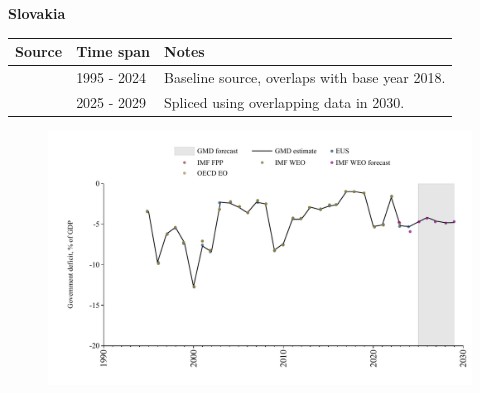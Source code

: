 \documentclass[12pt,a4paper,landscape]{article}
\begin{document}
\begin{adjustbox}{max totalsize={\paperwidth}{\paperheight},center}
\begin{minipage}[t][\textheight][t]{\textwidth}
\vspace*{0.5cm}
{}
\begin{center}
{\Large\bfseries Slovakia}
\end{center}
\vspace{0.5cm}
\begin{table}[H]
\centering
\small
\begin{tabular}{|l|l|l|}
\hline
\textbf{Source} & \textbf{Time span} & \textbf{Notes} \\
\hline
\rowcolor{white}\cite{EUS}& 1995 - 2024 &Baseline source, overlaps with base year 2018.\\
\rowcolor{lightgray}\cite{IMF_WEO_forecast}& 2025 - 2029 &Spliced using overlapping data in 2030.\\
\hline
\end{tabular}
\end{table}
\begin{figure}[H]
\centering
\includegraphics[width=\textwidth,height=0.6\textheight,keepaspectratio]{graphs/SVK_govdef_GDP.pdf}
\end{figure}
\end{minipage}
\end{adjustbox}
\end{document}

